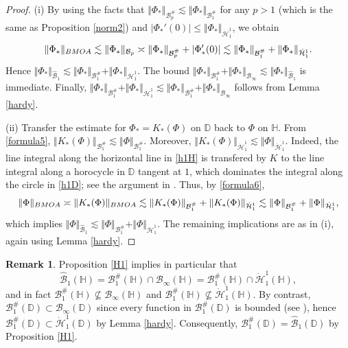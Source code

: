 \documentclass[amstex,12pt,reqno]{amsart}
\theoremstyle{definition}
\newtheorem{remark}{Remark}
\begin{document}
\begin{proof} 
(i) By using the facts that
$\Vert \Phi_* \Vert_{{\mathcal B}_p^{\#}} \lesssim \Vert \Phi_* \Vert_{{\mathcal B}_1^{\#}}$
for any $p>1$ (which is the same as Proposition \ref{norm2})
and $|\Phi_*'(0)| \leq \Vert \Phi_* \Vert_{\dot {\mathcal H}_1^1}$, we obtain 
\begin{equation}\label{formula6}
\Vert \Phi_* \Vert_{\rm BMOA} \lesssim
\Vert \Phi_* \Vert_{{\mathcal B}_p} \asymp
\Vert \Phi_* \Vert_{{\mathcal B}_p^{\#}}+|\Phi_*'(0)| \lesssim
\Vert \Phi_* \Vert_{{\mathcal B}_1^{\#}}+\Vert \Phi_* \Vert_{\dot {\mathcal H}_1^1}. 
\end{equation}
Hence 
$\Vert \Phi_* \Vert_{\widehat{\mathcal B}_1} \lesssim
\Vert \Phi_* \Vert_{{\mathcal B}_1^{\#}}+\Vert \Phi_* \Vert_{\dot {\mathcal H}_1^1}$.
The bound $\Vert \Phi_* \Vert_{{\mathcal B}_1^{\#}}+\Vert \Phi_* \Vert_{{\mathcal B}_\infty} 
\lesssim \Vert \Phi_* \Vert_{\widehat{\mathcal B}_1}$ is immediate.
Finally, $\Vert \Phi_* \Vert_{{\mathcal B}_1^{\#}}+\Vert \Phi_* \Vert_{\dot {\mathcal H}_1^1}
\lesssim \Vert \Phi_* \Vert_{{\mathcal B}_1^{\#}}+\Vert \Phi_* \Vert_{{\mathcal B}_\infty}$ follows from Lemma \ref{hardy}.

(ii) Transfer the estimate for $\Phi_*= K_*(\Phi)$ on $\mathbb D$ back to $\Phi$ on $\mathbb H$.
From \eqref{formula5}, 
$\Vert K_*(\Phi) \Vert_{{\mathcal B}_1^{\#}} \lesssim \Vert \Phi \Vert_{{\mathcal B}_1^{\#}}$.
Moreover, $\Vert K_*(\Phi)\Vert_{\dot {\mathcal H}_1^1} \lesssim 
\Vert \Phi \Vert_{\dot {\mathcal H}_1^1}$. Indeed, the line integral along the horizontal line in \eqref{h1H}
is transfered by $K$ to the line integral along a horocycle in $\mathbb D$ tangent at $1$, which dominates
the integral along the circle in \eqref{h1D}; see the argument in \cite[Section 11.1]{Du}. 
Thus, by \eqref{formula6},
$$
\Vert \Phi \Vert_{\rm BMOA} \asymp \Vert K_*(\Phi) \Vert_{\rm BMOA} 
\lesssim \Vert K_*(\Phi) \Vert_{{\mathcal B}_1^{\#}}+\Vert K_*(\Phi) \Vert_{\dot {\mathcal H}_1^1}
\lesssim \Vert \Phi \Vert_{{\mathcal B}_1^{\#}}+\Vert \Phi \Vert_{\dot {\mathcal H}_1^1},
$$
which implies 
$\Vert \Phi \Vert_{\widehat{\mathcal B}_1} \lesssim
\Vert \Phi \Vert_{{\mathcal B}_1^{\#}}+\Vert \Phi \Vert_{\dot {\mathcal H}_1^1}$.
The remaining implications are as in (i), again using Lemma \ref{hardy}.
\end{proof}

\begin{remark}\label{normHD}
Proposition \ref{H1} implies in particular that 
$$
\widehat{\mathcal B}_1(\mathbb H)={\mathcal B}_1^{\#}(\mathbb H) \cap {\mathcal B}_\infty(\mathbb H)
={\mathcal B}_1^{\#}(\mathbb H) \cap \dot {\mathcal H}_1^1(\mathbb H),
$$
and in fact ${\mathcal B}_1^{\#}(\mathbb H) \nsubseteq {\mathcal B}_\infty(\mathbb H)$ and
${\mathcal B}_1^{\#}(\mathbb H) \nsubseteq \dot{\mathcal H}_1^1(\mathbb H)$.
By contrast, ${\mathcal B}_1^{\#}(\mathbb D) \subset {\mathcal B}_\infty(\mathbb D)$ since
every function in ${\mathcal B}_1^{\#}(\mathbb D)$ is bounded (see \cite[Theorem 5.19]{Zhu}), hence
${\mathcal B}_1^{\#}(\mathbb D) \subset \dot{\mathcal H}_1^1(\mathbb D)$ 
by Lemma \ref{hardy}. Consequently, ${\mathcal B}_1^{\#}(\mathbb D)=\widehat {\mathcal B}_1(\mathbb D)$ by
Proposition \ref{H1}.
\end{remark}
\end{document}
